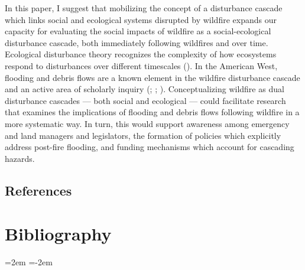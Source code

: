 \documentclass[
]{article}
\begin{document}
In this paper, I suggest that mobilizing the concept of a disturbance cascade which links social and ecological systems disrupted by wildfire expands our capacity for evaluating the social impacts of wildfire as a social-ecological disturbance cascade, both immediately following wildfires and over time. Ecological disturbance theory recognizes the complexity of how ecosystems respond to disturbances over different timescales (). In the American West, flooding and debris flows are a known element in the wildfire disturbance cascade and an active area of scholarly inquiry (; ; ). Conceptualizing wildfire as dual disturbance cascades --- both social and ecological --- could facilitate research that examines the implications of flooding and debris flows following wildfire in a more systematic way. In turn, this would support awareness among emergency and land managers and legislators, the formation of policies which explicitly address post-fire flooding, and funding mechanisms which account for cascading hazards.

\subsection{References}\label{references-3}

\section*{Bibliography}

\noindent
\leftskip=2em
\parindent=-2em
\end{document}
